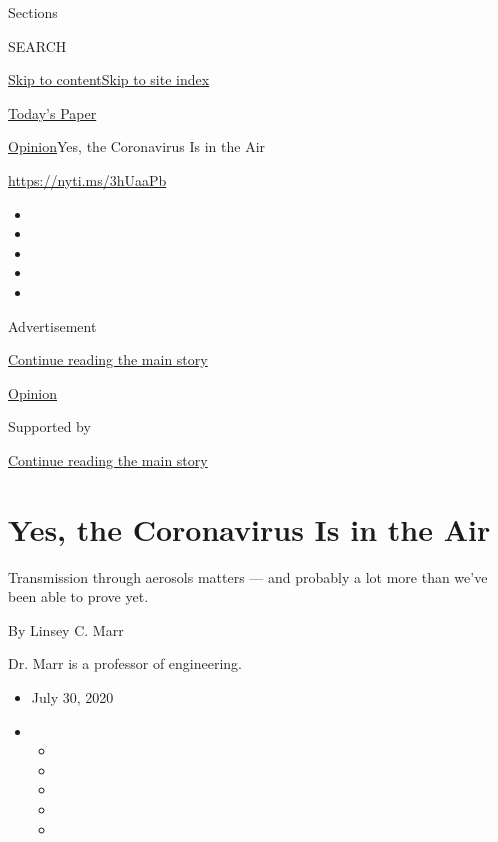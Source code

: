 Sections

SEARCH

\protect\hyperlink{site-content}{Skip to
content}\protect\hyperlink{site-index}{Skip to site index}

\href{https://myaccount.nytimes.com/auth/login?response_type=cookie\&client_id=vi}{}

\href{https://www.nytimes.com/section/todayspaper}{Today's Paper}

\href{/section/opinion}{Opinion}\textbar{}Yes, the Coronavirus Is in the
Air

\href{https://nyti.ms/3hUaaPb}{https://nyti.ms/3hUaaPb}

\begin{itemize}
\item
\item
\item
\item
\item
\end{itemize}

Advertisement

\protect\hyperlink{after-top}{Continue reading the main story}

\href{/section/opinion}{Opinion}

Supported by

\protect\hyperlink{after-sponsor}{Continue reading the main story}

\hypertarget{yes-the-coronavirus-is-in-the-air}{%
\section{Yes, the Coronavirus Is in the
Air}\label{yes-the-coronavirus-is-in-the-air}}

Transmission through aerosols matters --- and probably a lot more than
we've been able to prove yet.

By Linsey C. Marr

Dr. Marr is a professor of engineering.

\begin{itemize}
\item
  July 30, 2020
\item
  \begin{itemize}
  \item
  \item
  \item
  \item
  \item
  \end{itemize}
\end{itemize}

